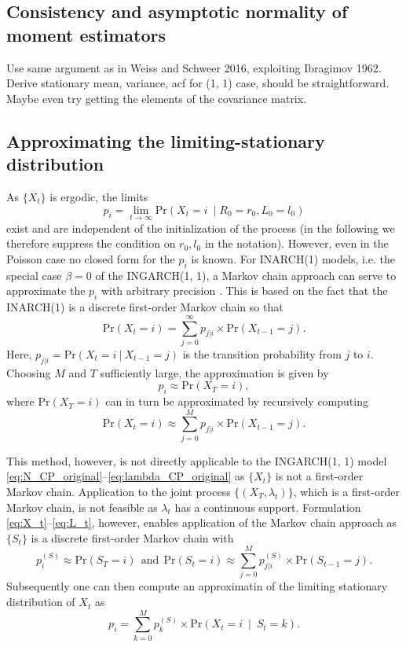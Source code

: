\documentclass[review]{elsarticle}
\begin{document}
\subsection{Consistency and asymptotic normality of moment estimators}

Use same argument as in Weiss and Schweer 2016, exploiting Ibragimov 1962. Derive stationary mean, variance, acf for (1, 1) case, should be straightforward. Maybe even try getting the elements of the covariance matrix.

\subsection{Approximating the limiting-stationary distribution}

As $\{X_t\}$ is ergodic, the limits
$$
p_i = \lim_{t \rightarrow \infty} \text{Pr}(X_t = i \ \mid R_0 = r_0, L_0 = l_0)
$$
exist and are independent of the initialization of the process (in the following we therefore suppress the condition on $r_0, l_0$ in the notation). However, even in the Poisson case no closed form for the $p_i$ is known. For INARCH(1) models, i.e. the special case $\beta = 0$ of the INGARCH(1, 1), a Markov chain approach can serve to approximate the $p_i$ with arbitrary precision \cite{Weiss2010}. This is based on the fact that the INARCH(1) is a discrete first-order Markov chain so that
$$
\text{Pr}(X_t = i) = \sum_{j = 0}^\infty p_{j|i} \times \text{Pr}(X_{t - 1} = j).
$$
Here, $p_{j|i} = \text{Pr}(X_t = i \ | \ X_{t - 1} = j) $ is the transition probability from $j$ to $i$. Choosing $M$ and $T$ sufficiently large, the approximation is given by
$$
p_i \approx \text{Pr}(X_T = i),
$$
where $\text{Pr}(X_T = i)$ can in turn be approximated by recursively computing
$$
\text{Pr}(X_t = i) \approx \sum_{j = 0}^M p_{j|i} \times \text{Pr}(X_{t - 1} = j).
$$

This method, however, is not directly applicable to the INGARCH(1, 1) model \eqref{eq:N_CP_original}--\eqref{eq:lambda_CP_original} as $\{X_t\}$ is not a first-order Markov chain. Application to the joint process $\{(X_T, \lambda_t)\}$, which is a first-order Markov chain, is not feasible as $\lambda_t$ has a continuous support. Formulation \eqref{eq:X_t}--\eqref{eq:L_t}, however, enables application of the Markov chain approach as $\{S_t\}$ is a discrete first-order Markov chain with
$$
p^{(S)}_i \approx \text{Pr}(S_T = i) \ \ \text{and} \ \ \text{Pr}(S_t = i) \approx \sum_{j = 0}^M p^{(S)}_{j|i} \times \text{Pr}(S_{t - 1} = j).
$$
Subsequently one can then compute an approximatin of the limiting stationary distribution of $X_t$ as
$$
p_i = \sum_{k = 0}^M p_k^{(S)} \times \text{Pr}(X_t = i \ \mid \ S_t = k).
$$
\end{document}
